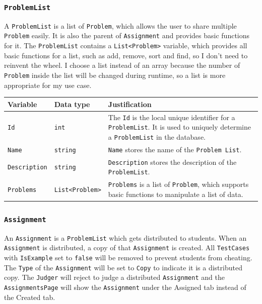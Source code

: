 \documentclass[a4paper]{report}
\begin{document}
\subsubsection{\texttt{ProblemList}}

A \texttt{ProblemList} is a list of \texttt{Problem}, which allows the user to share multiple \texttt{Problem} easily. It is also the parent of \texttt{Assignment} and provides basic functions for it. The \texttt{ProblemList} contains a \texttt{List<Problem>} variable, which provides all basic functions for a list, such as add, remove, sort and find, so I don't need to reinvent the wheel. I choose a list instead of an array because the number of \texttt{Problem} inside the list will be changed during runtime, so a list is more appropriate for my use case.

\begin{tabulary}{\textwidth}{|l|l|L|}
    \hline
    Variable & Data type & Justification \\
    \hline
    \texttt{Id} & \texttt{int} & The \texttt{Id} is the local unique identifier for a \texttt{ProblemList}. It is used to uniquely determine a \texttt{ProblemList} in the database. \\
    \hline
    \texttt{Name} & \texttt{string} & \texttt{Name} stores the name of the \texttt{Problem List}. \\
    \hline
    \texttt{Description} & \texttt{string} & \texttt{Description} stores the description of the \texttt{ProblemList}. \\
    \hline
    \texttt{Problems} & \texttt{List<Problem>} & \texttt{Problems} is a list of \texttt{Problem}, which supports basic functions to manipulate a list of data. \\
    \hline
\end{tabulary}

\subsubsection{\texttt{Assignment}}

An \texttt{Assignment} is a \texttt{ProblemList} which gets distributed to students. When an \texttt{Assignment} is distributed, a copy of that \texttt{Assignment} is created. All \texttt{TestCases} with \texttt{IsExample} set to \texttt{false} will be removed to prevent students from cheating. The \texttt{Type} of the \texttt{Assignment} will be set to \texttt{Copy} to indicate it is a distributed copy. The \texttt{Judger} will reject to judge a distributed \texttt{Assignment} and the \texttt{AssignmentsPage} will show the \texttt{Assignment} under the Assigned tab instead of the Created tab.
\end{document}
